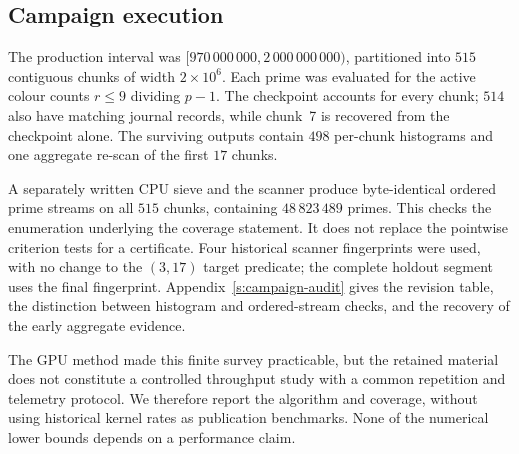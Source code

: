 \subsection{Campaign execution}\label{ss:execution}

The production interval was $[970\,000\,000,2\,000\,000\,000)$, partitioned
into $515$ contiguous chunks of width $2\times10^6$. Each prime was evaluated
for the active colour counts $r\le9$ dividing $p-1$. The checkpoint accounts
for every chunk; $514$ also have matching journal records, while chunk~7 is
recovered from the checkpoint alone. The surviving outputs contain $498$
per-chunk histograms and one aggregate re-scan of the first $17$ chunks.

A separately written CPU sieve and the scanner produce byte-identical
ordered prime streams on all $515$ chunks, containing $48\,823\,489$ primes.
This checks the enumeration underlying the coverage statement. It does not
replace the pointwise criterion tests for a certificate. Four historical
scanner fingerprints were used, with no change to the $(3,17)$ target
predicate; the complete holdout segment uses the final fingerprint.
Appendix~\ref{s:campaign-audit} gives the revision table, the distinction
between histogram and ordered-stream checks, and the recovery of the early
aggregate evidence.

The GPU method made this finite survey practicable, but the retained material
does not constitute a controlled throughput study with a common repetition
and telemetry protocol. We therefore report the algorithm and coverage,
without using historical kernel rates as publication benchmarks. None of the
numerical lower bounds depends on a performance claim.
